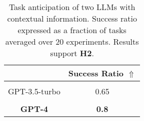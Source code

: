 \begin{table}[tb]
\centering
\captionsetup{font=scriptsize}
\begin{tabular}{| c | c |}
\hline
 & Success Ratio $\Uparrow$ \\
\hline
\\[-1em]
GPT-3.5-turbo & 0.65 \\
\hline
\\[-1em]
\textbf{GPT-4} & \textbf{0.8} \\
\hline
\end{tabular}
\setlength{\belowcaptionskip}{-5pt}
\caption{Task anticipation of two LLMs with contextual information. Success ratio expressed as a fraction of tasks averaged over 20 experiments. Results support \textbf{H2}.}
\label{h2_llm}
\end{table}
